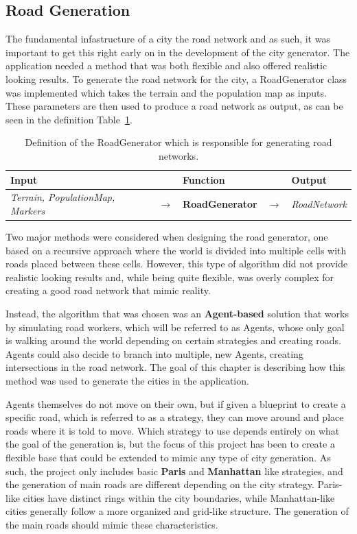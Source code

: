 \subsection{Road Generation}
The fundamental infastructure of a city the road network and as such, it was important to get this right early on in the development of the city generator.
The application needed a method that was both flexible and also offered realistic looking results.
To generate the road network for the city, a RoadGenerator class was implemented which takes the terrain and the population map as inputs.
These parameters are then used to produce a road network as output, as can be seen in the definition Table~\ref{table:def_roadgen}.

\begin{table}[H]
  \centering
  \begin{tabular}{lllll}
    \textbf{Input} & & \textbf{Function} & & \textbf{Output} \\
    \midrule
    \textit{Terrain, PopulationMap, Markers} & $\rightarrow$ & \textbf{RoadGenerator} & $\rightarrow$ & \textit{RoadNetwork} \\
    \bottomrule
  \end{tabular}

  \caption{Definition of the RoadGenerator which is responsible for generating road networks.}
  \label{table:def_roadgen}
\end{table}
\vspace{-0.4cm}

Two major methods were considered when designing the road generator, one based on a recursive approach where the world is divided into multiple cells with roads placed between these cells.
However, this type of algorithm did not provide realistic looking results and, while being quite flexible, was overly complex for creating a good road network that mimic reality.

Instead, the algorithm that was chosen was an \textbf{Agent-based} solution that works by simulating road workers, which will be referred to as Agents, whose only goal is walking around the world depending on certain strategies and creating roads.
Agents could also decide to branch into multiple, new Agents, creating intersections in the road network.
The goal of this chapter is describing how this method was used to generate the cities in the application.

Agents themselves do not move on their own, but if given a blueprint to create a specific road, which is referred to as a strategy, they can move around and place roads where it is told to move.
Which strategy to use depends entirely on what the goal of the generation is, but the focus of this project has been to create a flexible base that could be extended to mimic any type of city generation.
As such, the project only includes basic \textbf{Paris} and \textbf{Manhattan} like strategies, and the generation of main roads are different depending on the city strategy.
Paris-like cities have distinct rings within the city boundaries, while Manhattan-like cities generally follow a more organized and grid-like structure.
The generation of the main roads should mimic these characteristics.

